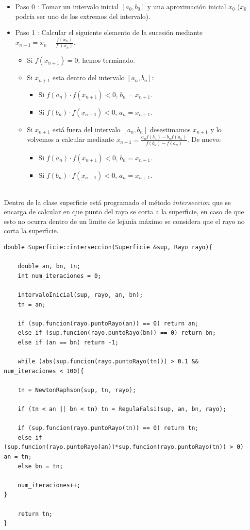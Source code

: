 \begin{itemize}
	\item Paso 0 : Tomar un intervalo inicial $[a_0, b_0]$ y una aproximación inicial $x_0$ ($x_0$ podría ser uno de los extremos del intervalo).
	\item Paso 1 : Calcular el siguiente elemento de la sucesión mediante $x_{n+1} = x_n - \frac{f(x_n)}{f'(x_n)}$.
	\begin{itemize}
		\item Si $f(x_{n+1}) = 0$, hemos terminado.
		\item Si $x_{n+1}$ esta dentro del intervalo $[a_n, b_n]$:
		\begin{itemize}
			\item Si $f(a_n) \cdot f(x_{n+1}) < 0$, $b_n = x_{n+1}$.
			\item Si $f(b_n) \cdot f(x_{n+1}) < 0$, $a_n = x_{n+1}$.
		\end{itemize}
		\item Si $x_{n+1}$ está fuera del intervalo $[a_n, b_n]$ desestimamos $x_{n+1}$ y lo volvemos a calcular mediante $x_{n+1} = \frac{a_n f(b_n) - b_n f(a_n)}{f(b_n) - f(a_n)}$. De nuevo:
		\begin{itemize}
			\item Si $f(a_n) \cdot f(x_{n+1}) < 0$, $b_n = x_{n+1}$.
			\item Si $f(b_n) \cdot f(x_{n+1}) < 0$, $a_n = x_{n+1}$.
		\end{itemize}
	\end{itemize}
\end{itemize}
${ }$\\


Dentro de la clase superficie está programado el método $interseccion$ que se encarga de calcular en que punto del rayo se corta a la superficie, en caso de que esto no ocurra dentro de un limite de lejanía máximo se considera que el rayo no corta la superficie.
${ }$\\

\begin{lstlisting}[style=Consola]
double Superficie::interseccion(Superficie &sup, Rayo rayo){

	double an, bn, tn;
	int num_iteraciones = 0;

	intervaloInicial(sup, rayo, an, bn);
	tn = an;

	if (sup.funcion(rayo.puntoRayo(an)) == 0) return an;
	else if (sup.funcion(rayo.puntoRayo(bn)) == 0) return bn;
	else if (an == bn) return -1;

	while (abs(sup.funcion(rayo.puntoRayo(tn))) > 0.1 && num_iteraciones < 100){

	tn = NewtonRaphson(sup, tn, rayo);

	if (tn < an || bn < tn) tn = RegulaFalsi(sup, an, bn, rayo);

	if (sup.funcion(rayo.puntoRayo(tn)) == 0) return tn;
	else if (sup.funcion(rayo.puntoRayo(an))*sup.funcion(rayo.puntoRayo(tn)) > 0) an = tn;
	else bn = tn;

	num_iteraciones++;
}

	return tn;
}
\end{lstlisting}
${ }$\\


